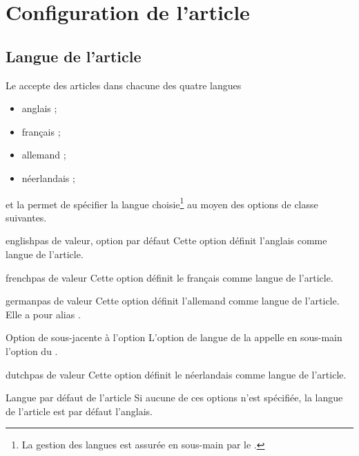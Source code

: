 \documentclass[french,nolocaltoc]{nwejmart}
\newtheorem[style=definition]{fait}
\newtheorem[title=expérience]{experience}
\newtheorem[title-plural=anneaux]{anneau}
\newtheorem[title=idéal,title-plural=idéaux]{ideal}
\begin{document}
\section{Configuration de l'article}

\subsection{Langue de l'article}
\label{sec:langue-de-larticle}

Le \nwejm{} accepte des articles dans chacune des quatre langues
\begin{itemize}
\item anglais ;
\item français ;
\item allemand ;
\item néerlandais ;
\end{itemize}
et la \nwejmauthorcl{} permet de spécifier la langue choisie\footnote{La gestion
  des langues est assurée en sous-main par le .} au moyen des
options de classe suivantes.

\begin{docKey}{english}{}{pas de valeur, option par défaut}
  Cette option définit l'anglais comme langue de l'article.
\end{docKey}
\begin{docKey}{french}{}{pas de valeur}
  Cette option définit le français comme langue de l'article.
\end{docKey}
\begin{docKey}{german}{}{pas de valeur}
  Cette option définit l'allemand comme langue de l'article. Elle a pour alias
  .
  \begin{dbremark}{Option de  sous-jacente à l'option
      \protect{}}{}
    L'option de langue  de la \nwejmauthorcl{} appelle en
    sous-main l'option  du .
  \end{dbremark}
\end{docKey}
\begin{docKey}{dutch}{}{pas de valeur}
  Cette option définit le néerlandais comme langue de l'article.
\end{docKey}

\begin{dbremark}{Langue par défaut de l'article}{}
  Si aucune de ces options n'est spécifiée, la langue de l'article est par
  défaut l'anglais.
\end{dbremark}
\end{document}
